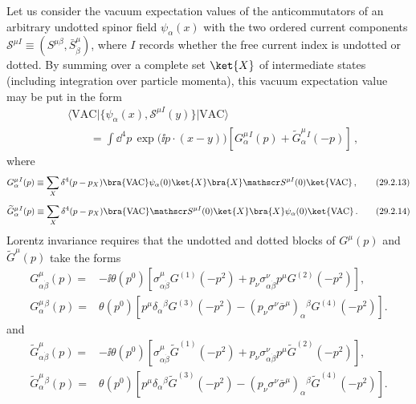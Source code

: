 Let us consider the vacuum expectation values of the anticommutators of an
arbitrary undotted spinor field \(\psi_\alpha(x)\) with the two ordered
current components
\(\mathscr S^{\mu I}\equiv
(S^{\mu\beta},\bar S^\mu_{\dot\beta})\), where \(I\) records whether the
free current index is undotted or dotted. By summing over
a complete set \(\ket{X}\) of intermediate states (including
integration over particle momenta), this vacuum expectation value may be
put in the form
\begin{equation}
  \begin{aligned}
  &\langle\mathrm{VAC}\lvert
    \{\psi_\alpha(x),\mathscr S^{\mu I}(y)\}
    \rvert\mathrm{VAC}\rangle
  \\
  &\qquad
  =\int \dd^4p\,\exp\bigl(\ii p\mathbin{\cdot}(x-y)\bigr)
    \left[G^\mu_\alpha{}^I(p)
    +\widetilde G^\mu_\alpha{}^I(-p)\right]\,,
  \end{aligned}
  \tag{29.2.12}\label{eq:29.2.12}
\end{equation}
where
\begin{equation}
  G^\mu_\alpha{}^I(p)
  \equiv
  \sum_X\delta^4(p-p_X)
  \bra{\mathrm{VAC}}\psi_\alpha(0)\ket{X}
  \bra{X}\mathscr S^{\mu I}(0)\ket{\mathrm{VAC}}\,,
  \tag{29.2.13}\label{eq:29.2.13}
\end{equation}
\begin{equation}
  \widetilde G^\mu_\alpha{}^I(p)
  \equiv
  \sum_X\delta^4(p-p_X)
  \bra{\mathrm{VAC}}\mathscr S^{\mu I}(0)\ket{X}
  \bra{X}\psi_\alpha(0)\ket{\mathrm{VAC}}\,.
  \tag{29.2.14}\label{eq:29.2.14}
\end{equation}
Lorentz invariance requires that the undotted and dotted blocks of
\(G^\mu(p)\) and \(\widetilde G^\mu(p)\) take the forms
\begin{equation}
  \begin{aligned}
  G^\mu_{\alpha\dot\beta}(p)
  ={}&-\ii\theta(p^0)\left[
    \sigma^\mu_{\alpha\dot\beta}G^{(1)}(-p^2)
    +p_\nu\sigma^\nu_{\alpha\dot\beta}
      p^\mu G^{(2)}(-p^2)\right],
  \\
  G^\mu_\alpha{}^\beta(p)
  ={}&\theta(p^0)\left[
    p^\mu\delta_\alpha{}^\beta G^{(3)}(-p^2)
    -(p_\nu\sigma^\nu\bar\sigma^\mu)_\alpha{}^\beta
      G^{(4)}(-p^2)\right].
  \end{aligned}
  \tag{29.2.15}\label{eq:29.2.15}
\end{equation}
and
\begin{equation}
  \begin{aligned}
  \widetilde G^\mu_{\alpha\dot\beta}(p)
  ={}&-\ii\theta(p^0)\left[
    \sigma^\mu_{\alpha\dot\beta}\widetilde G^{(1)}(-p^2)
    +p_\nu\sigma^\nu_{\alpha\dot\beta}
      p^\mu\widetilde G^{(2)}(-p^2)\right],
  \\
  \widetilde G^\mu_\alpha{}^\beta(p)
  ={}&\theta(p^0)\left[
    p^\mu\delta_\alpha{}^\beta\widetilde G^{(3)}(-p^2)
    -(p_\nu\sigma^\nu\bar\sigma^\mu)_\alpha{}^\beta
      \widetilde G^{(4)}(-p^2)\right].
  \end{aligned}
  \tag{29.2.16}\label{eq:29.2.16}
\end{equation}
